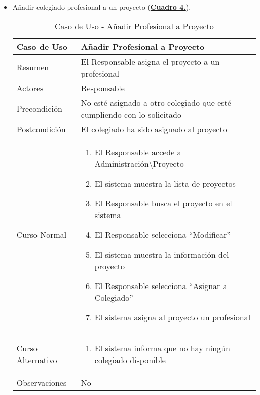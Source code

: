 \begin{itemize}
  \newpage~
	\item \addtocounter{tabla}{1} Añadir colegiado profesional a un proyecto (\textbf{\hyperref[tab:curAsignarProfProyecto]{Cuadro 4.}}). 
		\begin{table}[!htbp]
		  \centering  \addtocounter{casouso}{1}
		  \begin{tabular}{|l | p{100mm}|}
		    \textbf{Caso de Uso}  & \textbf{Añadir Profesional a Proyecto} \\ \hline
		    Resumen 		 & El Responsable asigna el proyecto a un profesional \\ \hline
		    Actores  		 & Responsable \\ \hline
		    Precondición  	 & No esté asignado a otro colegiado que esté cumpliendo con lo solicitado  \\ \hline
		    Postcondición  	 & El colegiado ha sido asignado al proyecto \\ \hline
		    Curso Normal   	 & \begin{enumerate}
		    \item El Responsable accede a Administración\textbackslash Proyecto
			  \item El sistema muestra la lista de proyectos
			  \item El Responsable busca el proyecto en el sistema
			  \item El Responsable selecciona ``Modificar''
			  \item El sistema muestra la información del proyecto
			  \item El Responsable selecciona ``Asignar a Colegiado''
			  \item El sistema asigna al proyecto un profesional
		    \end{enumerate}  \\ \hline
		    Curso Alternativo  & \begin{enumerate}
			  \item El sistema informa que no hay ningún colegiado disponible
		    \end{enumerate}  \\ \hline
		    Observaciones 	 & No  \\ \hline
		  \end{tabular}
		  \caption{Caso de Uso  - Añadir Profesional a Proyecto}
		  \label{tab:curAsignarProfProyecto}
		\end{table}
		\FloatBarrier
		

\end{itemize}
